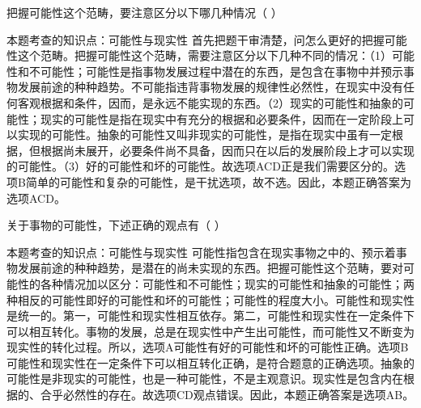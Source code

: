 \question 把握可能性这个范畴，要注意区分以下哪几种情况（ ）
\par{}
\begin{solution}本题考查的知识点：可能性与现实性
首先把题干审清楚，问怎么更好的把握可能性这个范畴。把握可能性这个范畴，需要注意区分以下几种不同的情况：（1）可能性和不可能性；可能性是指事物发展过程中潜在的东西，是包含在事物中并预示事物发展前途的种种趋势。不可能指违背事物发展的规律性必然性，在现实中没有任何客观根据和条件，因而，是永远不能实现的东西。（2）现实的可能性和抽象的可能性；现实的可能性是指在现实中有充分的根据和必要条件，因而在一定阶段上可以实现的可能性。抽象的可能性又叫非现实的可能性，是指在现实中虽有一定根据，但根据尚未展开，必要条件尚不具备，因而只在以后的发展阶段上才可以实现的可能性。（3）好的可能性和坏的可能性。故选项ACD正是我们需要区分的。选项B简单的可能性和复杂的可能性，是干扰选项，故不选。因此，本题正确答案为选项ACD。
\end{solution}
\question 关于事物的可能性，下述正确的观点有（ ）
\par{}
\begin{solution}本题考查的知识点：可能性与现实性
可能性指包含在现实事物之中的、预示着事物发展前途的种种趋势，是潜在的尚未实现的东西。把握可能性这个范畴，要对可能性的各种情况加以区分：可能性和不可能性；现实的可能性和抽象的可能性；两种相反的可能性即好的可能性和坏的可能性；可能性的程度大小。可能性和现实性是统一的。第一，可能性和现实性相互依存。第二，可能性和现实性在一定条件下可以相互转化。事物的发展，总是在现实性中产生出可能性，而可能性又不断变为现实性的转化过程。所以，选项A可能性有好的可能性和坏的可能性正确。选项B可能性和现实性在一定条件下可以相互转化正确，是符合题意的正确选项。抽象的可能性是非现实的可能性，也是一种可能性，不是主观意识。现实性是包含内在根据的、合乎必然性的存在。故选项CD观点错误。因此，本题正确答案是选项AB。
\end{solution}
